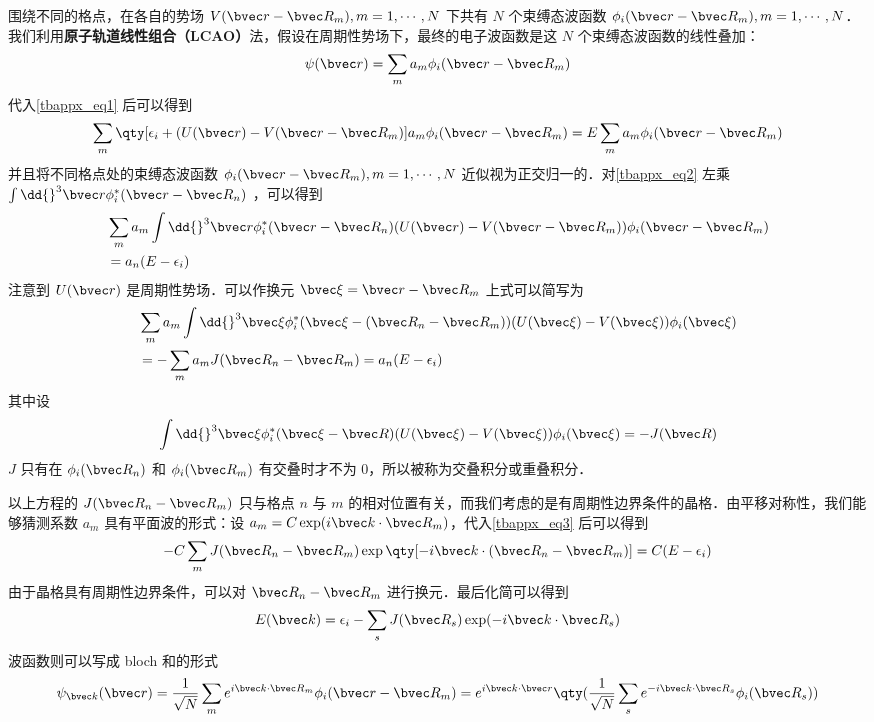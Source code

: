 围绕不同的格点，在各自的势场 $V(\bvec r-\bvec R_m),m=1,\cdots,N$ 下共有 $N$ 个束缚态波函数 $\phi_i(\bvec r-\bvec R_m),m=1,\cdots,N$．我们利用\textbf{原子轨道线性组合（LCAO）}法，假设在周期性势场下，最终的电子波函数是这 $N$ 个束缚态波函数的线性叠加：
\begin{equation}
\psi(\bvec r)=\sum_{m} a_m \phi_i(\bvec r-\bvec R_m)
\end{equation}
代入\autoref{tbappx_eq1} 后可以得到
\begin{equation}\label{tbappx_eq2}
\sum_{m}\qty[\epsilon_i+(U(\bvec r)-V(\bvec r-\bvec R_m)]a_m\phi_i(\bvec r-\bvec R_m)=E\sum_{m} a_m\phi_i(\bvec r-\bvec R_m)
\end{equation}
并且将不同格点处的束缚态波函数 $\phi_i(\bvec r-\bvec R_m),m=1,\cdots,N$ 近似视为正交归一的．对\autoref{tbappx_eq2} 左乘 $\int \dd{}^3 \bvec r\phi_i^*(\bvec r-\bvec R_n)$ ，可以得到
\begin{equation}
\begin{aligned}
&\sum_m a_m \int \dd{}^3 \bvec r \phi_i^*(\bvec r-\bvec R_n)(U(\bvec r)-V(\bvec r-\bvec R_m))\phi_i(\bvec r-\bvec R_m)\\
&=a_n(E-\epsilon_i)
\end{aligned}
\end{equation}
注意到 $U(\bvec r)$ 是周期性势场．可以作换元  $\bvec \xi=\bvec r-\bvec R_m$ 上式可以简写为
\begin{equation}\label{tbappx_eq3}
\begin{aligned}
&\sum_m a_m \int \dd{}^3 \bvec \xi \phi_i^*(\bvec \xi-(\bvec R_n-\bvec R_m))(U(\bvec \xi)-V(\bvec \xi))\phi_i(\bvec \xi)
\\
&=-\sum_m a_m J(\bvec R_n-\bvec R_m)=a_n(E-\epsilon_i)
\end{aligned}
\end{equation}
其中设
\begin{equation}\label{tbappx_eq5}
\int \dd{}^3 \bvec \xi \phi_i^*(\bvec \xi-\bvec R)(U(\bvec \xi)-V(\bvec \xi))\phi_i(\bvec \xi)=-J(\bvec R)
\end{equation}
$J$ 只有在 $\phi_i(\bvec R_n)$ 和 $\phi_i(\bvec R_m)$ 有交叠时才不为 $0$，所以被称为交叠积分或重叠积分．

以上方程的 $J(\bvec R_n-\bvec R_m)$ 只与格点 $n$ 与 $m$ 的相对位置有关，而我们考虑的是有周期性边界条件的晶格．由平移对称性，我们能够猜测系数 $a_m$ 具有平面波的形式：设 $a_m=C\exp(i \bvec k\cdot \bvec R_m)$，代入\autoref{tbappx_eq3} 后可以得到
\begin{equation}
-C\sum_m J(\bvec R_n-\bvec R_m)\exp\qty[-i\bvec k\cdot (\bvec R_n-\bvec R_m)]=C(E-\epsilon_i)
\end{equation}
由于晶格具有周期性边界条件，可以对 $\bvec R_n-\bvec R_m$ 进行换元．最后化简可以得到
\begin{equation}\label{tbappx_eq4}
E(\bvec k)=\epsilon_i-\sum_s J(\bvec R_s)\exp(-i\bvec k\cdot \bvec R_s)
\end{equation}
波函数则可以写成 bloch 和的形式
\begin{equation}
\psi_{\bvec k}(\bvec r)=\frac{1}{\sqrt{N}}\sum_m e^{i\bvec k\cdot \bvec R_m}\phi_i(\bvec r-\bvec R_m)=e^{i\bvec k\cdot \bvec r}\qty(\frac{1}{\sqrt{N}}\sum_s e^{-i\bvec k\cdot \bvec R_s}\phi_i(\bvec R_s))
\end{equation}


